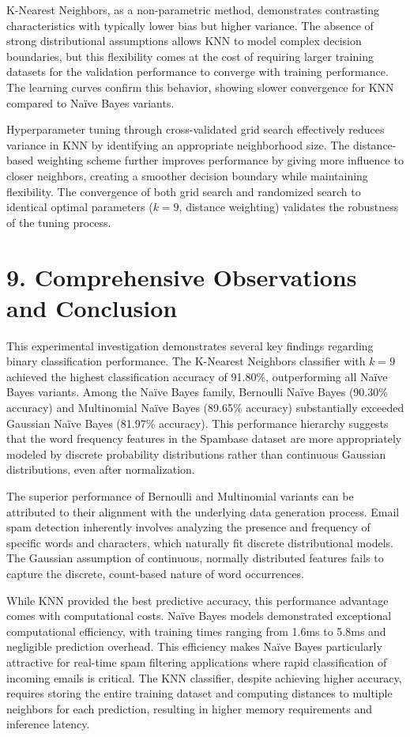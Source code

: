 \documentclass[11pt]{article}
\begin{document}
K-Nearest Neighbors, as a non-parametric method, demonstrates contrasting characteristics with typically lower bias but higher variance. The absence of strong distributional assumptions allows KNN to model complex decision boundaries, but this flexibility comes at the cost of requiring larger training datasets for the validation performance to converge with training performance. The learning curves confirm this behavior, showing slower convergence for KNN compared to Na\"ive Bayes variants.

Hyperparameter tuning through cross-validated grid search effectively reduces variance in KNN by identifying an appropriate neighborhood size. The distance-based weighting scheme further improves performance by giving more influence to closer neighbors, creating a smoother decision boundary while maintaining flexibility. The convergence of both grid search and randomized search to identical optimal parameters ($k=9$, distance weighting) validates the robustness of the tuning process.

\section*{9. Comprehensive Observations and Conclusion}
This experimental investigation demonstrates several key findings regarding binary classification performance. The K-Nearest Neighbors classifier with $k=9$ achieved the highest classification accuracy of 91.80\%, outperforming all Na\"ive Bayes variants. Among the Na\"ive Bayes family, Bernoulli Na\"ive Bayes (90.30\% accuracy) and Multinomial Na\"ive Bayes (89.65\% accuracy) substantially exceeded Gaussian Na\"ive Bayes (81.97\% accuracy). This performance hierarchy suggests that the word frequency features in the Spambase dataset are more appropriately modeled by discrete probability distributions rather than continuous Gaussian distributions, even after normalization.

The superior performance of Bernoulli and Multinomial variants can be attributed to their alignment with the underlying data generation process. Email spam detection inherently involves analyzing the presence and frequency of specific words and characters, which naturally fit discrete distributional models. The Gaussian assumption of continuous, normally distributed features fails to capture the discrete, count-based nature of word occurrences.

While KNN provided the best predictive accuracy, this performance advantage comes with computational costs. Na\"ive Bayes models demonstrated exceptional computational efficiency, with training times ranging from 1.6ms to 5.8ms and negligible prediction overhead. This efficiency makes Na\"ive Bayes particularly attractive for real-time spam filtering applications where rapid classification of incoming emails is critical. The KNN classifier, despite achieving higher accuracy, requires storing the entire training dataset and computing distances to multiple neighbors for each prediction, resulting in higher memory requirements and inference latency.
\end{document}
